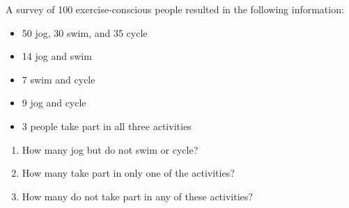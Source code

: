 \begin{example}
    A survey of 100 exercise-conscious people resulted in the following information:
    \begin{itemize}
        \item 50 jog, 30 swim, and 35 cycle
        \item 14 jog and swim
        \item 7 swim and cycle
        \item 9 jog and cycle
        \item 3 people take part in all three activities
    \end{itemize}
    \begin{enumerate}
        \item How many jog but do not swim or cycle?
        \item How many take part in only one of the activities?
        \item How many do not take part in any of these activities?
    \end{enumerate}
\end{example}


